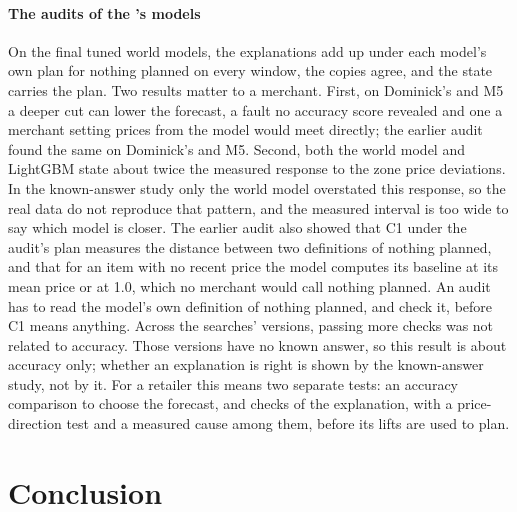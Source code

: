 \paragraph{The audits of the \companion{} 's models}
On the final tuned world models, the explanations add up under each model's own
plan for nothing planned on every window, the copies agree, and the state
carries the plan. Two results matter to a merchant. First, on Dominick's
and M5 a deeper cut can lower the forecast, a fault no accuracy score
revealed and one a merchant setting prices from the model would meet directly;
the earlier audit found the same on Dominick's and M5. Second, both the world
model and LightGBM state about twice the measured response to the zone price
deviations. In the known-answer study only the world model overstated this
response, so the real data do not reproduce that pattern, and the measured
interval is too wide to say which model is closer. The earlier audit also showed
that C1 under the audit's plan measures the distance between two definitions of
nothing planned, and that for an item with no recent price the model computes
its baseline at its mean price or at 1.0, which no merchant would call nothing
planned. An audit has to read the model's own definition of nothing planned,
and check it, before C1 means anything. Across the searches' versions, passing
more checks was not related to accuracy. Those versions have no known answer, so this result is about
accuracy only; whether an explanation is right is shown by the known-answer study, not by it. For a retailer this means two separate
tests: an accuracy comparison to choose the forecast, and checks of the
explanation, with a price-direction test and a measured cause among them,
before its lifts are used to plan.

\section{Conclusion}
\label{sec:conclusion}

